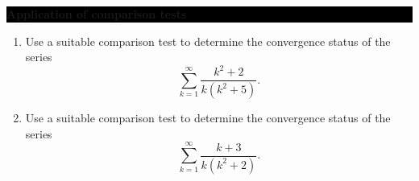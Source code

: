 \documentclass[oneside,10pt]{amsart}
\newcommand{\cbox}[1]{\colorbox{black}{\begin{minipage}{\linewidth}\color{white}\sffamily #1 \end{minipage}}}
\newcommand{\topic}[1]{\cbox{\textbf{#1}}}
\newcounter{pass}
\newif\ifshowanswers
\newcommand{\solution}[1]{\ifshowanswers{\newline\colorbox{black!20}{\begin{minipage}{\linewidth}\color{black}{#1}\end{minipage}}
}\else\fi}
\begin{document}
\topic{Application of comparison tests}
\solution{I tend to prefer the application of the limit comparison test, but anything doable with the limit comparison test can normally be achieved with an equivalent use of the standard comparison test.}
\begin{enumerate}
\setcounter{enumi}{\value{pass}}
\item
Use a suitable comparison test to determine the convergence status of the series
$$ \sum_{k=1}^\infty \frac{k^2 + 2}{k(k^2 + 5)}.$$
\solution{The dominant behaviour of the term here is $k^2$ in the numerator and $k^3$ in the denominator so the we should compare to the term $1/k$ which is the term of a divergent series.

Writing $a_k$ for the series term in the question and examining the limit of the ratio we get
\begin{align*}
\lim_{k \to \infty} \frac{a_k}{1/k}
&= \lim_{k \to \infty} \left ( \frac{k^3 + 2k}{k^3 + 5k} \right )\\
&=1
\end{align*}
So the series in question compares with the divergent harmonic series and so by the limit comparison test the series is also divergent.
}
\item
Use a suitable comparison test to determine the convergence status of the series
$$ \sum_{k=1}^\infty \frac{k+3}{k(k^2 + 2)}.$$
\solution{The dominant behaviour of the term here is $k^1$ in the numerator and $k^3$ in the denominator so the we should compare to the term $1/k^2$ which is the term of a convergent series.

Writing $a_k$ for the series term in the question and examining the limit of the ratio we get
\begin{align*}
\lim_{k \to \infty} \frac{a_k}{1/k^2}
&= \lim_{k \to \infty} \left ( \frac{k^3 + 3k^2}{k^3 + 2k} \right )\\
&=1
\end{align*}
So the series in question compares with a convergent series and so by the limit comparison test the series is also convergent.
}
\setcounter{pass}{\value{enumi}}
\end{enumerate}
\vskip 2pt
\end{document}
